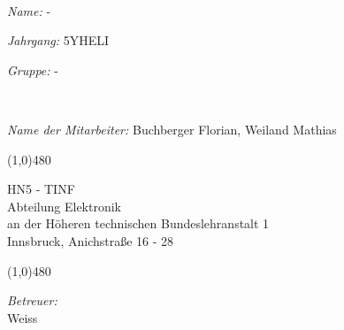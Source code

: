 \documentclass[12pt, a4paper]{article}
\begin{document}
\def \Titel 			{Combination Lock}
\def \Name				{-}
\def \NameMitarbeiter	{Buchberger Florian, Weiland Mathias}
\def \Betreuer			{Weiss}
\def \Ausgefuehrt		{24. 03. 14}
\def \Abgegeben			{01. 04. 14}
\def \Jahrgang			{5YHELI}
\def \Gruppe			{-}



\begin{titlepage}
~\\[0.5cm]
\begin{minipage}{0.4\textwidth}
\begin{flushleft} \large

\emph{Name:} \Name
\end{flushleft}
\end{minipage}
\begin{minipage}{0.3\textwidth}
\begin{center}\large
\emph{Jahrgang:} \Jahrgang
\end{center}
\end{minipage}
\hspace{0.5cm}
\begin{minipage}{0.2\textwidth}
\begin{flushright} \large
\emph{Gruppe:} \Gruppe
\end{flushright}
\end{minipage}
~\\[0.6cm]
\begin{minipage}{0.8\textwidth}
\begin{flushleft} \large
\emph{Name der Mitarbeiter:} \NameMitarbeiter
\end{flushleft}
\end{minipage}
\begin{center}
\line(1,0){480}
\end{center}
\begin{center}
\textsc{\LARGE HN5 - TINF}\\
\large Abteilung Elektronik\\[1cm]
an der H\"oheren technischen Bundeslehranstalt 1\\
Innsbruck, Anichstraße 16 - 28
\end{center}
\begin{center}
\line(1,0){480}
\end{center}
\begin{minipage}{0.2\textwidth}
\begin{flushleft} \large
\emph{Betreuer:}\\
\Betreuer
\end{flushleft}
\end{minipage}

\end{titlepage}
\end{document}
